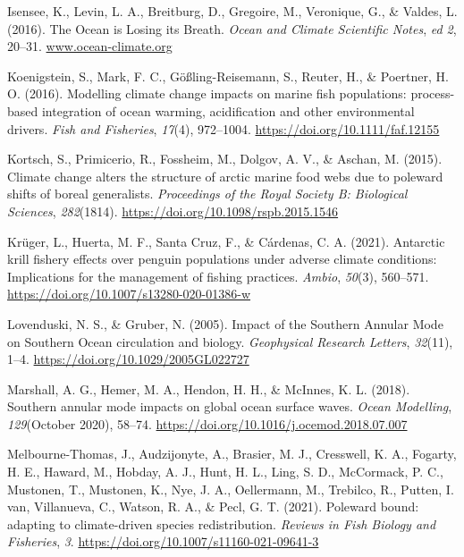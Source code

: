 \documentclass[
]{article}
\newlength{\cslhangindent}
\newenvironment{cslreferences}%
  {\setlength{\parindent}{0pt}%
  \everypar{\setlength{\hangindent}{\cslhangindent}}\ignorespaces}%
  {\par}
\begin{document}
\begin{cslreferences}
\leavevmode\hypertarget{ref-Isensee2016}{}%
Isensee, K., Levin, L. A., Breitburg, D., Gregoire, M., Veronique, G.,
\& Valdes, L. (2016). The Ocean is Losing its Breath. \emph{Ocean and
Climate Scientific Notes}, \emph{ed 2}, 20--31.
\url{www.ocean-climate.org}

\leavevmode\hypertarget{ref-Koenigstein2016}{}%
Koenigstein, S., Mark, F. C., Gößling-Reisemann, S., Reuter, H., \&
Poertner, H. O. (2016). Modelling climate change impacts on marine fish
populations: process-based integration of ocean warming, acidification
and other environmental drivers. \emph{Fish and Fisheries},
\emph{17}(4), 972--1004. \url{https://doi.org/10.1111/faf.12155}

\leavevmode\hypertarget{ref-Kortsch2015}{}%
Kortsch, S., Primicerio, R., Fossheim, M., Dolgov, A. V., \& Aschan, M.
(2015). Climate change alters the structure of arctic marine food webs
due to poleward shifts of boreal generalists. \emph{Proceedings of the
Royal Society B: Biological Sciences}, \emph{282}(1814).
\url{https://doi.org/10.1098/rspb.2015.1546}

\leavevmode\hypertarget{ref-Kruger2021}{}%
Krüger, L., Huerta, M. F., Santa Cruz, F., \& Cárdenas, C. A. (2021).
Antarctic krill fishery effects over penguin populations under adverse
climate conditions: Implications for the management of fishing
practices. \emph{Ambio}, \emph{50}(3), 560--571.
\url{https://doi.org/10.1007/s13280-020-01386-w}

\leavevmode\hypertarget{ref-Lovenduski2005}{}%
Lovenduski, N. S., \& Gruber, N. (2005). Impact of the Southern Annular
Mode on Southern Ocean circulation and biology. \emph{Geophysical
Research Letters}, \emph{32}(11), 1--4.
\url{https://doi.org/10.1029/2005GL022727}

\leavevmode\hypertarget{ref-Marshall2018}{}%
Marshall, A. G., Hemer, M. A., Hendon, H. H., \& McInnes, K. L. (2018).
Southern annular mode impacts on global ocean surface waves. \emph{Ocean
Modelling}, \emph{129}(October 2020), 58--74.
\url{https://doi.org/10.1016/j.ocemod.2018.07.007}

\leavevmode\hypertarget{ref-Melbourne-Thomas2021}{}%
Melbourne-Thomas, J., Audzijonyte, A., Brasier, M. J., Cresswell, K. A.,
Fogarty, H. E., Haward, M., Hobday, A. J., Hunt, H. L., Ling, S. D.,
McCormack, P. C., Mustonen, T., Mustonen, K., Nye, J. A., Oellermann,
M., Trebilco, R., Putten, I. van, Villanueva, C., Watson, R. A., \&
Pecl, G. T. (2021). Poleward bound: adapting to climate-driven species
redistribution. \emph{Reviews in Fish Biology and Fisheries}, \emph{3}.
\url{https://doi.org/10.1007/s11160-021-09641-3}


\end{cslreferences}
\end{document}

